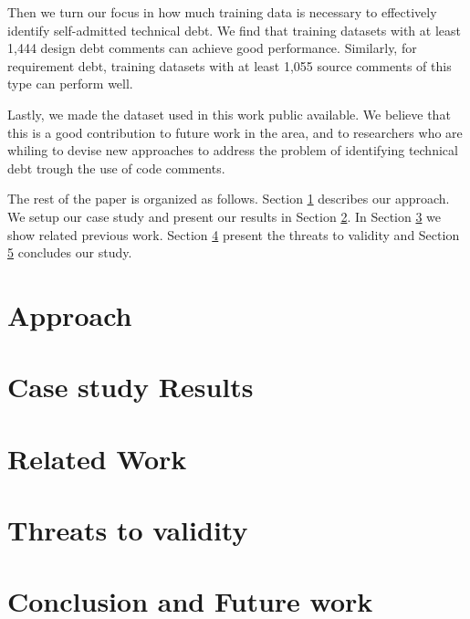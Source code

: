 \documentclass{sig-alternate}
\newcommand{\SATD}{self-admitted technical debt\xspace}
\begin{document}
Then we turn our focus in how much training data is necessary to effectively identify \SATD. We find that training datasets with at least 1,444 design debt comments can achieve good performance. Similarly, for requirement debt, training datasets with at least 1,055 source comments of this type can perform well.  

Lastly, we made the dataset used in this work public available. We believe that this is a good contribution to future work in the area, and to researchers who are whiling to devise new approaches to address the problem of identifying technical debt trough the use of code comments.

The rest of the paper is organized as follows. Section \ref{sec:approach} describes our approach. We setup our case study and present our
results in Section \ref{sec:case_study_results}. In Section \ref{sec:related_work} we show related previous work. Section \ref{sec:threats_to_validity} present the threats to validity and Section \ref{sec:conclusion} concludes our study.  
%

%

\section{Approach}
\label{sec:approach}


\section{Case study Results}
\label{sec:case_study_results}


%

\section{Related Work}
\label{sec:related_work}


\section{Threats to validity}
\label{sec:threats_to_validity}


\section{Conclusion and Future work}
\label{sec:conclusion}



  


\end{document}
